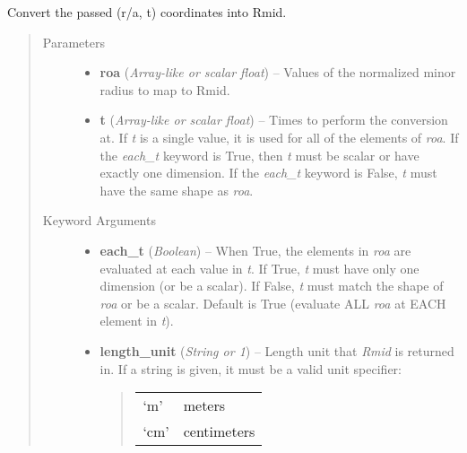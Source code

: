 \documentclass[letterpaper,10pt,english]{sphinxmanual}
\begin{document}
\begin{fulllineitems}
\begin{fulllineitems}
\end{fulllineitems}


\begin{fulllineitems}
\label{eqtools:eqtools.core.Equilibrium.roa2rmid}
Convert the passed (r/a, t) coordinates into Rmid.
\begin{quote}\begin{description}
\item[{Parameters}] \leavevmode\begin{itemize}
\item {} 
\textbf{roa} (\emph{Array-like or scalar float}) --
Values of the normalized minor
radius to map to Rmid.

\item {} 
\textbf{t} (\emph{Array-like or scalar float}) --
Times to perform the conversion at.
If \emph{t} is a single value, it is used for all of the elements of
\emph{roa}. If the \emph{each\_t} keyword is True, then \emph{t} must be scalar
or have exactly one dimension. If the \emph{each\_t} keyword is False,
\emph{t} must have the same shape as \emph{roa}.

\end{itemize}

\item[{Keyword Arguments}] \leavevmode\begin{itemize}
\item {} 
\textbf{each\_t} (\emph{Boolean}) --
When True, the elements in \emph{roa} are evaluated
at each value in \emph{t}. If True, \emph{t} must have only one dimension
(or be a scalar). If False, \emph{t} must match the shape of \emph{roa}
or be a scalar. Default is True (evaluate ALL \emph{roa} at EACH
element in \emph{t}).

\item {} 
\textbf{length\_unit} (\emph{String or 1}) --
Length unit that \emph{Rmid} is returned in.
If a string is given, it must be a valid unit specifier:
\begin{quote}

\begin{tabulary}{\linewidth}{|L|L|}
\hline

`m'
 & 
meters
\\

`cm'
 & 
centimeters
\\


\end{tabulary}
\end{quote}
\end{itemize}
\end{description}
\end{quote}
\end{fulllineitems}
\end{fulllineitems}
\end{document}
